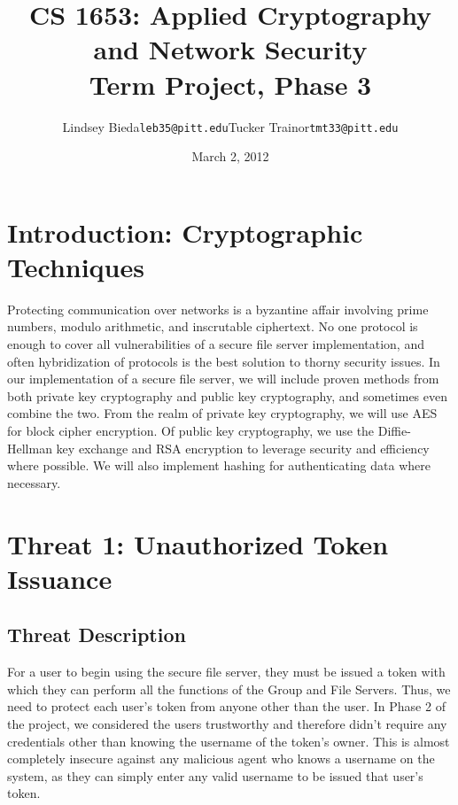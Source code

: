 \documentclass[11pt]{article}
\title{CS 1653: Applied Cryptography and Network Security\\Term Project, Phase 3}
\author{Lindsey Bieda\quad\texttt{leb35@pitt.edu}\qquad Tucker Trainor\quad\texttt{tmt33@pitt.edu}}
\date{March 2, 2012} %
\begin{document}
\maketitle
\section{Introduction: Cryptographic Techniques}
Protecting communication over networks is a byzantine affair involving prime numbers, modulo arithmetic, and inscrutable ciphertext. No one protocol is enough to cover all vulnerabilities of a secure file server implementation, and often hybridization of protocols is the best solution to thorny security issues. In our implementation of a secure file server, we will include proven methods from both private key cryptography and public key cryptography, and sometimes even combine the two. From the realm of private key cryptography, we will use AES for block cipher encryption. Of public key cryptography, we use the Diffie-Hellman key exchange and RSA encryption to leverage security and efficiency where possible. We will also implement hashing for authenticating data where necessary.
\section{Threat 1: Unauthorized Token Issuance}
\subsection{Threat Description}
For a user to begin using the secure file server, they must be issued a token with which they can perform all the functions of the Group and File Servers. Thus, we need to protect each user's token from anyone other than the user. In Phase 2 of the project, we considered the users trustworthy and therefore didn't require any credentials other than knowing the username of the token's owner. This is almost completely insecure against any malicious agent who knows a username on the system, as they can simply enter any valid username to be issued that user's token.
\end{document}
